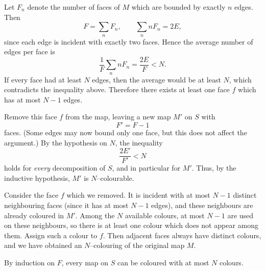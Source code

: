 \documentclass[12pt,a4paper]{article}
\theoremstyle{plain}
\theoremstyle{definition}      %
\begin{document}
	Let $F_n$ denote the number of faces of $M$ which are bounded by exactly
	$n$ edges.  Then
	\[
	F = \sum_n F_n,
	\qquad
	\sum_n nF_n = 2E,
	\]
	since each edge is incident with exactly two faces.
	Hence the average number of edges per face is
	\[
	\frac{1}{F}\sum_n nF_n
	= \frac{2E}{F}
	< N.
	\]
	If every face had at least $N$ edges, then the average would be at least
	$N$, which contradicts the inequality above.
	Therefore there exists at least one face $f$ which has at most $N-1$
	edges.
	
	Remove this face $f$ from the map, leaving a new map $M'$ on $S$ with
	\[
	F' = F-1
	\]
	faces.  (Some edges may now bound only one face, but this does not affect
	the argument.)
	By the hypothesis on $N$, the inequality
	\[
	\frac{2E'}{F'} < N
	\]
	holds for \emph{every} decomposition of $S$, and in particular for $M'$.
	Thus, by the inductive hypothesis, $M'$ is $N$--colourable.
	
	Consider the face $f$ which we removed.  It is incident with at most
	$N-1$ distinct neighbouring faces (since it has at most $N-1$ edges), and
	these neighbours are already coloured in $M'$.
	Among the $N$ available colours, at most $N-1$ are used on these
	neighbours, so there is at least one colour which does not appear among
	them.
	Assign such a colour to $f$.
	Then adjacent faces always have distinct colours, and we have obtained an
	$N$--colouring of the original map $M$.
	
	By induction on $F$, every map on $S$ can be coloured with at most $N$
	colours.
\end{document}
